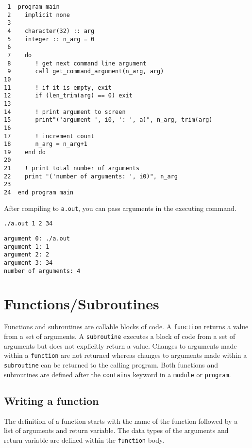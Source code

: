 \documentclass[11pt]{article}
\begin{document}
\begin{verbatim}
 1  program main
 2    implicit none
 3  
 4    character(32) :: arg
 5    integer :: n_arg = 0
 6  
 7    do
 8       ! get next command line argument
 9       call get_command_argument(n_arg, arg)
10  
11       ! if it is empty, exit
12       if (len_trim(arg) == 0) exit
13  
14       ! print argument to screen
15       print"('argument ', i0, ': ', a)", n_arg, trim(arg)
16  
17       ! increment count
18       n_arg = n_arg+1
19    end do
20  
21    ! print total number of arguments
22    print "('number of arguments: ', i0)", n_arg
23  
24  end program main
\end{verbatim}

After compiling to \texttt{a.out}, you can pass arguments in the executing command.

\begin{verbatim}
./a.out 1 2 34
\end{verbatim}

\begin{verbatim}
argument 0: ./a.out
argument 1: 1
argument 2: 2
argument 3: 34
number of arguments: 4
\end{verbatim}
\section{Functions/Subroutines}
\label{sec:orgheadline52}
Functions and subroutines are callable blocks of code. A \texttt{function} returns a value from a set of arguments. A \texttt{subroutine} executes a block of code from a set of arguments but does not explicitly return a value. Changes to arguments made within a \texttt{function} are not returned whereas changes to arguments made within a \texttt{subroutine} can be returned to the calling program. Both functions and subroutines are defined after the \texttt{contains} keyword in a \texttt{module} or \texttt{program}.
\subsection{Writing a function}
\label{sec:orgheadline42}
The definition of a function starts with the name of the function followed by a list of arguments and return variable. The data types of the arguments and return variable are defined within the \texttt{function} body.
\end{document}
